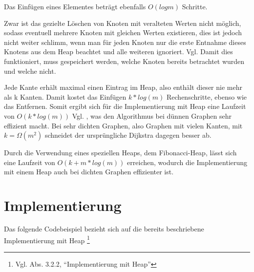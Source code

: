 \parindent0pt Das Einfügen eines Elementes beträgt ebenfalls $O(log m)$ Schritte.

\parindent0pt Zwar ist das gezielte Löschen von Knoten mit veralteten Werten nicht möglich, sodass eventuell mehrere Knoten mit gleichen Werten existieren, dies ist jedoch nicht weiter schlimm, \glqq wenn man für jeden Knoten nur die erste Entnahme dieses Knotens aus dem Heap beachtet und alle weiteren ignoriert\grqq.
Vgl. \cite[S.576 Z.29-31, Algorithmus]{OttWid90}
 Damit dies funktioniert, muss  gespeichert werden, welche Knoten bereits betrachtet wurden und welche nicht.

\parindent0pt Jede Kante erhält maximal einen Eintrag im Heap, also enthält dieser nie mehr als k Kanten. Damit kostet das Einfügen $k*log(m)$ Rechenschritte, ebenso wie das Entfernen. Somit ergibt sich für die Implementierung mit Heap eine Laufzeit von $O(k*log(m))$
Vgl. \cite[S. 576 Z.36]{OttWid90}
, was den Algorithmus bei dünnen Graphen sehr effizient macht.
Bei sehr dichten Graphen, also Graphen mit vielen Kanten,  mit $k = \Omega (m^{2})$ schneidet der ursprüngliche Dijkstra dagegen besser ab.

\parindent0pt Durch die Verwendung eines speziellen Heaps, dem Fibonacci-Heap, lässt sich eine Laufzeit von $O(k + m * log(m))$ 
\cite[S. 577 Z.10]{OttWid90}
 erreichen, wodurch die Implementierung mit einem Heap auch bei dichten Graphen effizienter ist.


\section{Implementierung}

Das folgende Codebeispiel bezieht sich auf die bereits beschriebene Implementierung mit Heap \footnote{Vgl. Abs. 3.2.2, ``Implementierung mit Heap''}

